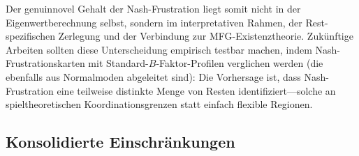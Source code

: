 \documentclass[12pt,a4paper]{article}
\theoremstyle{remark}
\begin{document}
\noindent Der genuinnovel Gehalt der Nash-Frustration liegt somit nicht in der Eigenwertberechnung selbst, sondern im interpretativen Rahmen, der Rest-spezifischen Zerlegung und der Verbindung zur MFG-Existenztheorie. Zuk\"unftige Arbeiten sollten diese Unterscheidung empirisch testbar machen, indem Nash-Frustrationskarten mit Standard-$B$-Faktor-Profilen verglichen werden (die ebenfalls aus Normalmoden abgeleitet sind): Die Vorhersage ist, dass Nash-Frustration eine teilweise distinkte Menge von Resten identifiziert---solche an spieltheoretischen Koordinationsgrenzen statt einfach flexible Regionen.

\subsection{Konsolidierte Einschr\"ankungen}
\end{document}
